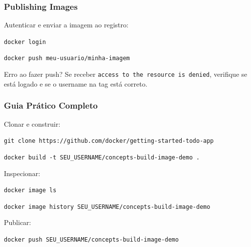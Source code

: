\begin{frame}
  \frametitle{Publishing Images}
  Autenticar e enviar a imagem ao registro:

  \vspace{0.3em}
  \texttt{docker login}

  \vspace{0.3em}
  \texttt{docker push meu-usuario/minha-imagem}

  \vspace{0.5em}
  \begin{alertblock}{Erro ao fazer push?}
    Se receber \texttt{access to the resource is denied}, verifique se está
    logado e se o username na tag está correto.
  \end{alertblock}
\end{frame}

\begin{frame}
  \frametitle{Guia Prático Completo}
  Clonar e construir:

  \vspace{0.3em}
  \texttt{git clone https://github.com/docker/getting-started-todo-app}

  \vspace{0.3em}
  \texttt{docker build -t SEU\_USERNAME/concepts-build-image-demo .}

  \vspace{0.5em}
  Inspecionar:

  \vspace{0.3em}
  \texttt{docker image ls}

  \vspace{0.3em}
  \texttt{docker image history SEU\_USERNAME/concepts-build-image-demo}

  \vspace{0.5em}
  Publicar:

  \vspace{0.3em}
  \texttt{docker push SEU\_USERNAME/concepts-build-image-demo}
\end{frame}